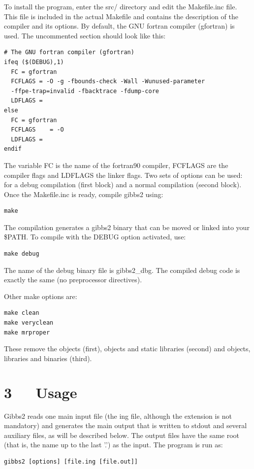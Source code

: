 \documentclass[a4paper]{article}
\begin{document}
To install the program, enter the src/ directory and edit the
Makefile.inc file. This file is included in the actual Makefile and
contains the description of the compiler and its options. By default,
the GNU fortran compiler (gfortran) is used. The uncommented section
should look like this:
%
\asciilist
\begin{lstlisting}
# The GNU fortran compiler (gfortran)
ifeq ($(DEBUG),1)
  FC = gfortran
  FCFLAGS = -O -g -fbounds-check -Wall -Wunused-parameter
  -ffpe-trap=invalid -fbacktrace -fdump-core
  LDFLAGS =
else
  FC = gfortran
  FCFLAGS    = -O
  LDFLAGS =
endif
\end{lstlisting}

The variable FC is the name of the fortran90 compiler, FCFLAGS are the
compiler flags and LDFLAGS the linker flags. Two sets of options can
be used: for a debug compilation (first block) and a normal
compilation (second block). Once the Makefile.inc is ready, compile
gibbs2 using:
%
\asciilist
\begin{lstlisting}
make
\end{lstlisting}

The compilation generates a gibbs2 binary that can be moved or linked
into your \$PATH. To compile with the DEBUG option activated, use:
%
\asciilist
\begin{lstlisting}
make debug
\end{lstlisting}

The name of the debug binary file is gibbs2\_dbg. The compiled debug
code is exactly the same (no preprocessor directives).

Other make options are:
%
\asciilist
\begin{lstlisting}
make clean
make veryclean
make mrproper
\end{lstlisting}

These remove the objects (first), objects and static libraries
(second) and objects, libraries and binaries (third).


\section{3~~~Usage%
  \label{usage}%
}

Gibbs2 reads one main input file (the ing file, although the extension
is not mandatory) and generates the main output that is written to
stdout and several auxiliary files, as will be described below. The
output files have the same root (that is, the name up to the last '.')
as the input. The program is run as:
%
\asciilist
\begin{lstlisting}
gibbs2 [options] [file.ing [file.out]]
\end{lstlisting}
\end{document}
